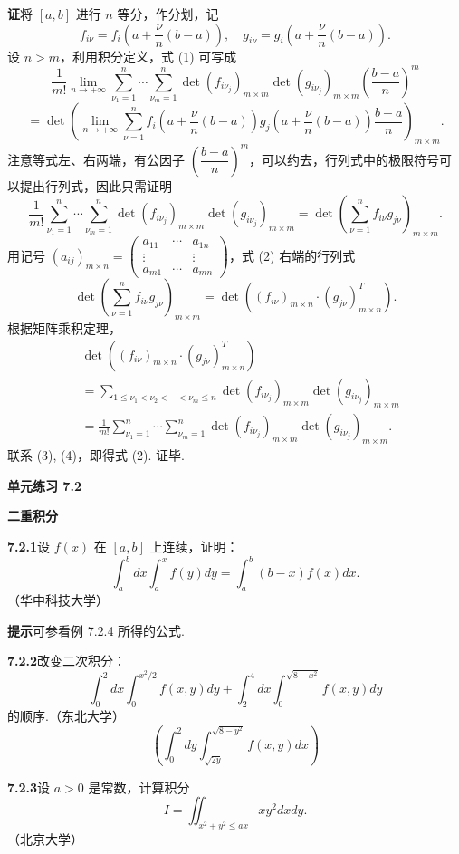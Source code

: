 \documentclass[UTF8,12pt,a4paper,fontset=fandol]{ctexart}
\begin{document}
\noindent\textbf{证}\quad 将 $[a,b]$ 进行 $n$ 等分，作分划，记
\[
f_{i\nu}=f_i\left(a+\frac\nu n(b-a)\right),\quad
g_{i\nu}=g_i\left(a+\frac\nu n(b-a)\right).
\]
设 $n>m$，利用积分定义，式 (1) 可写成
\[
\frac1{m!}\lim_{n\to+\infty}
\sum_{\nu_1=1}^n\cdots\sum_{\nu_m=1}^n
\det(f_{i\nu_j})_{m\times m}\det(g_{i\nu_j})_{m\times m}
\left(\frac{b-a}{n}\right)^m
\]
\[
=\det\left(
\lim_{n\to+\infty}\sum_{\nu=1}^n
f_i\left(a+\frac\nu n(b-a)\right)
g_j\left(a+\frac\nu n(b-a)\right)\frac{b-a}{n}
\right)_{m\times m}.
\]
注意等式左、右两端，有公因子 $\left(\dfrac{b-a}{n}\right)^m$，可以约去，行列式中的极限符号可以提出行列式，因此只需证明
\[
\frac1{m!}\sum_{\nu_1=1}^n\cdots\sum_{\nu_m=1}^n
\det(f_{i\nu_j})_{m\times m}\det(g_{i\nu_j})_{m\times m}
=\det\left(\sum_{\nu=1}^n f_{i\nu}g_{j\nu}\right)_{m\times m}. \tag{2}
\]
用记号 $(a_{ij})_{m\times n}=\begin{pmatrix}
a_{11}&\cdots&a_{1n}\\
\vdots&&\vdots\\
a_{m1}&\cdots&a_{mn}
\end{pmatrix}$，式 (2) 右端的行列式
\[
\det\left(\sum_{\nu=1}^n f_{i\nu}g_{j\nu}\right)_{m\times m}
=\det\left((f_{i\nu})_{m\times n}\cdot(g_{j\nu})_{m\times n}^{T}\right). \tag{3}
\]
根据矩阵乘积定理，
\[
\begin{aligned}
&\det\left((f_{i\nu})_{m\times n}\cdot(g_{j\nu})_{m\times n}^{T}\right)\\
&=\sum_{1\le\nu_1<\nu_2<\cdots<\nu_m\le n}
\det(f_{i\nu_j})_{m\times m}\det(g_{i\nu_j})_{m\times m}\\
&=\frac1{m!}\sum_{\nu_1=1}^n\cdots\sum_{\nu_m=1}^n
\det(f_{i\nu_j})_{m\times m}\det(g_{i\nu_j})_{m\times m}.
\end{aligned} \tag{4}
\]
联系 (3), (4)，即得式 (2). 证毕.

\noindent\textbf{单元练习 7.2}

\noindent\textbf{二重积分}

\noindent\textbf{7.2.1}\quad 设 $f(x)$ 在 $[a,b]$ 上连续，证明：
\[
\int_a^bdx\int_a^x f(y)dy=\int_a^b(b-x)f(x)dx.
\]
（华中科技大学）

\noindent\textbf{提示}\quad 可参看例 7.2.4 所得的公式.

\noindent\textbf{7.2.2}\quad 改变二次积分：
\[
\int_0^2dx\int_0^{x^2/2}f(x,y)dy+
\int_2^4dx\int_0^{\sqrt{8-x^2}}f(x,y)dy
\]
的顺序.（东北大学）
\[
\left(\int_0^2dy\int_{\sqrt{2y}}^{\sqrt{8-y^2}}f(x,y)dx\right)
\]

\noindent\textbf{7.2.3}\quad 设 $a>0$ 是常数，计算积分
\[
I=\iint_{x^2+y^2\le ax}xy^2dxdy.
\]
（北京大学）
\end{document}
